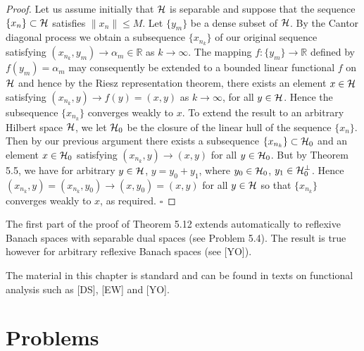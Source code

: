 \begin{proof}
Let us assume initially that $\mathcal{H}$ is separable and suppose that the sequence $\{x_n\}\subset \mathcal{H}$ satisfies $\|x_n\|\leq M$. Let $\{y_m\}$ be a dense subset of $\mathcal{H}$. By the Cantor diagonal process we obtain a subsequence $\{x_{n_k}\}$ of our original sequence satisfying $(x_{n_k},y_m)\to \alpha_m\in \mathbb{R}$ as $k\to\infty$. The mapping $f:\{y_m\}\to \mathbb{R}$ defined by $f(y_m)=\alpha_m$ may consequently be extended to a bounded linear functional $f$ on $\mathcal{H}$ and hence by the Riesz representation theorem, there exists an element $x\in \mathcal{H}$ satisfying $(x_{n_k},y)\to f(y)=(x,y)$ as $k\to\infty$, for all $y\in \mathcal{H}$. Hence the subsequence $\{x_{n_k}\}$ converges weakly to $x$.
To extend the result to an arbitrary Hilbert space $\mathcal{H}$, we let $\mathcal{H}_0$ be the closure of the linear hull of the sequence $\{x_n\}$. Then by our previous argument there exists a subsequence $\{x_{n_k}\}\subset \mathcal{H}_0$ and an element $x\in \mathcal{H}_0$ satisfying $(x_{n_k},y)\to (x,y)$ for all $y\in \mathcal{H}_0$. But by Theorem 5.5, we have for arbitrary $y\in \mathcal{H}$, $y=y_0+y_1$, where $y_0\in \mathcal{H}_0$, $y_1\in \mathcal{H}_0^\perp$. Hence $(x_{n_k},y)=(x_{n_k},y_0)\to (x,y_0)=(x,y)$ for all $y\in \mathcal{H}$ so that $\{x_{n_k}\}$ converges weakly to $x$, as required. $\square$
\end{proof}

\begin{remark}
The first part of the proof of Theorem 5.12 extends automatically to reflexive Banach spaces with separable dual spaces (see Problem 5.4). The result is true however for arbitrary reflexive Banach spaces (see [YO]).
\end{remark}

\begin{remark}
The material in this chapter is standard and can be found in texts on functional analysis such as [DS], [EW] and [YO].
\end{remark}

\section*{Problems}

